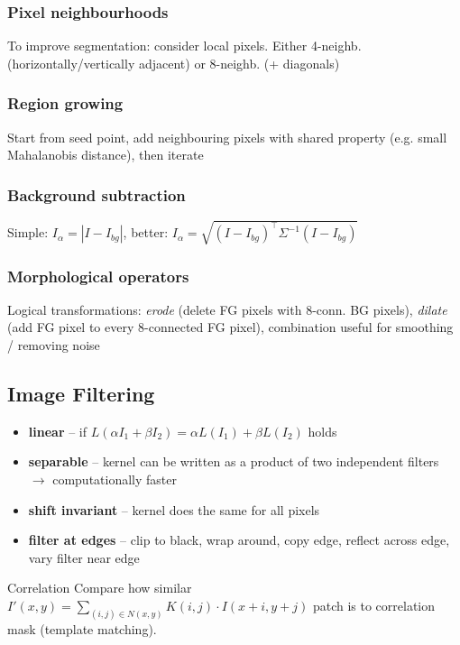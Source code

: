 \documentclass[a4paper,10pt]{article}
\begin{document}
\subsubsection{Pixel neighbourhoods}
To improve segmentation: consider local pixels. Either 4-neighb. (horizontally/vertically adjacent) or 8-neighb. (+ diagonals)

\subsubsection{Region growing}
Start from seed point, add neighbouring pixels with shared property (e.g. small Mahalanobis distance), then iterate

\subsubsection{Background subtraction}
Simple: \( I_\alpha = \left| I - I_{bg} \right| \), better: \( I_\alpha = \sqrt{(I-I_{bg})^\top \Sigma^{-1} (I-I_{bg})}  \)

\subsubsection{Morphological operators} 
Logical transformations: \textit{erode} (delete FG pixels with 8-conn. BG pixels), \textit{dilate} (add FG pixel to every 8-connected FG pixel), combination useful for smoothing / removing noise

\subsection{Image Filtering}
\begin{itemize}
    \item \textbf{linear} -- if \( L(\alpha I_{1} + \beta I_{2}) = \alpha L(I_{1}) + \beta L(I_{2}) \) holds
    \item \textbf{separable} -- kernel can be written as a product of two independent filters \( \to  \) computationally faster
    \item \textbf{shift invariant} -- kernel does the same for all pixels
    \item \textbf{filter at edges} -- clip to black, wrap around, copy edge, reflect across edge, vary filter near edge
\end{itemize}
\begin{mainbox}{Correlation}
    Compare how similar \( I'(x,y) = \sum_{(i,j) \in N(x,y)} K(i,j) \cdot I(x+i,y+j) \) patch is to correlation mask (template matching).
\end{mainbox}
\end{document}
